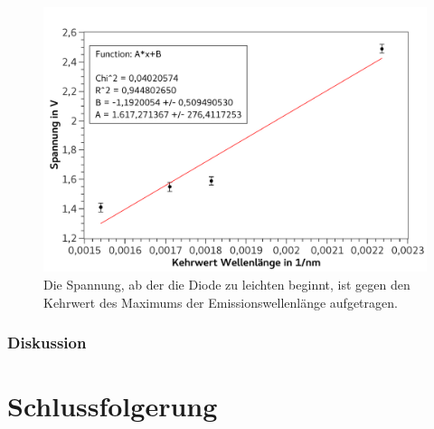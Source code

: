 \documentclass[
	a4paper,
	12pt,
	pagesize,
	ngerman
]{scrartcl}
\begin{document}
	\begin{figure}[H] 
		\includegraphics[width=1\textwidth]{fig_led} 
		\centering
		\caption{Die Spannung, ab der die Diode zu leichten beginnt, ist gegen den Kehrwert des Maximums der Emissionswellenlänge aufgetragen.}
		\label{fig_led}
		\centering
	\end{figure}	

	
	\subsubsection{Diskussion}
	
	
	
	
	\section{Schlussfolgerung}
	
	\printbibliography
\end{document}
